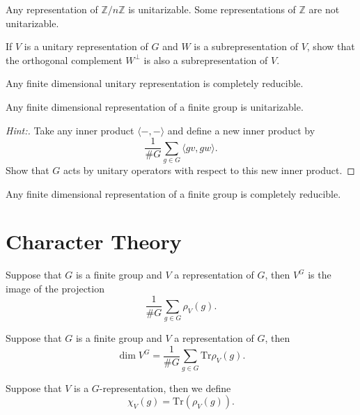 \documentclass[11pt]{article}
\begin{document}
\begin{exercise}
Any representation of $\mathbb{Z}/n\mathbb{Z}$ is unitarizable.  Some representations of $\mathbb{Z}$ are not unitarizable.
\end{exercise}

\begin{exercise}
If $V$ is a unitary representation of $G$ and $W$ is a subrepresentation of $V$, show that the orthogonal complement $W^\perp$ is also a subrepresentation of $V$.
\end{exercise}

\begin{exercise}
Any finite dimensional unitary representation is completely reducible.
\end{exercise}

\begin{exercise}
Any finite dimensional representation of a finite group is unitarizable.
\end{exercise}
\begin{proof}[Hint:]
Take any inner product $\langle-,-\rangle$ and define a new inner product by $$\frac{1}{\# G} \sum_{g \in G} \langle gv, gw\rangle.$$  Show that $G$ acts by unitary operators with respect to this new inner product.
\end{proof}

\begin{exercise}
Any finite dimensional representation of a finite group is completely reducible.
\end{exercise}


\section{Character Theory}

\begin{exercise}
Suppose that $G$ is a finite group and $V$ a representation of $G$, then $V^G$ is the image of the projection
$$\frac{1}{\# G}\sum_{g \in G} \rho_V(g).$$
\end{exercise}

\begin{exercise} \label{Invariant-Trace}
Suppose that $G$ is a finite group and $V$ a representation of $G$, then
$$\dim V^G = \frac{1}{\# G} \sum_{g \in G} \mathrm{Tr} \rho_V(g).$$
\end{exercise}

\begin{definition}
Suppose that $V$ is a $G$-representation, then we define $$\chi_V(g) = \mathrm{Tr}(\rho_V(g)).$$
\end{definition}
\end{document}
